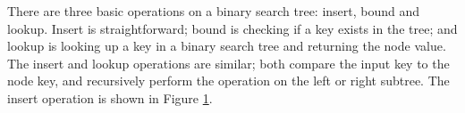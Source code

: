 There are three  basic operations on a binary search tree: insert, bound and lookup. Insert is straightforward; bound is checking if a key exists in the tree; and lookup
is looking up a key in a binary search tree and returning the node value. The insert and lookup operations are similar; both compare the input key to the node key, and recursively perform the operation on the left 
or right subtree. The insert operation is shown in Figure \ref{lst:insert}.

\begin{figure}[!ht]
  \centering 
  
  \caption{}
  \label{lst:insert}
\end{figure}

